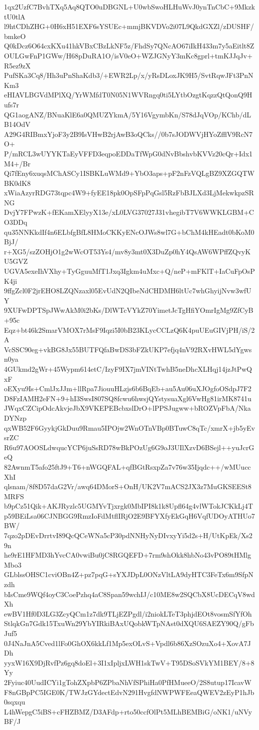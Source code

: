 1qx2UzfC7BvhTXq5Aq8QTO0uDBGNL+U0wbSwoHLHuWvJ0ynTnCbC+9MkzktU0tlA
l9htCDhZHG+0H6xH51EXF6sYSUEc+mmjBKVDVo2i07L9QkdGXZl/zDUSHF/bmkeO
Q0kDcz6O64cxKXu41hkVBxCBzLkNF5z/FhdSy7QNcAO67iIkH433m7y5aEitlt8Z
OULGwFnP1GWw/H68pDuRA1O/isV0eO+WZJGNyY3mKc8gprl+tmKJJqJv+R5ez9zX
PufSKa3Cq8/Hh3uPnShaKdb3/+EWR2Lp/x/yRsDLoxJK9H5/SvtRqwJFt3PnNKm3
eHIAVLBGVdMPlXQ/YrWMfdT0N05N1WVRngq0ti5LYtbOzgtKqzzQtQonQ9Hufs7r
QG1aogANZ/BNuaKlE6a0QMUZYkmA/5Y16VgymbKn/S78dJqVOp/KChb/dLB14OdV
A29G4RIBmxYjoF3y2B9IsVHwB2rjAwB3oQCks//0b7sJODWVjHYoZfflV9RcN7O+
P/mRCL3wUYYKTaEyVFFD3eqpoEDDaTfWpG0dNvBbshvbKVVz20cQr+Idx1M4+/Br
Qi7fEny6xuqsMChASCy1ISBKLuWMd9+YbO3aps+pF2nFzVQLgBZ9XZGQTWBK0dK8
xWiaAzyrRDG73tqpc4W9+fyEE18pk0OpSFpPqGsl5RzFbBJLXd3LjMekwkpzSRNG
DvjY7FPwzK+fEKamXElyyX13e/xL0LVG37027J31vhegibT7V6WWKLGBM+CO3DDq
qu35NNKkdIf4n6ELbfgBfL8HMoCKKyENcOJWs8wl7G+bChM4kHEadt0bKoM0BjJ/
r+XG5/szZOHjO1g2wWcOT53Ys4/mv8y3mt0X3DuZp0hY4QsAW6WPffZQvyKU5GVZ
UGVA5exeIhVXhy+TyGguuMfT1Jxq3Igkm4uMxc+Q/neP+mFKlT+IaCuFpOsPK4ji
9ffgZcl0F2jrEHO8LZQNzaxl05EvUdN2QIbeNdCHDMH6ltUc7whGhyijNvw3wfUY
9XUFwDPTSpJWwAkM0i2bKs/DlWTcVYkZ70YimetJcTgHfiYOmrIgMg9ZfCyB+95c
Eqz+bt46k2SmarVMOX7rMsF9Iqzi5I0bB23KLycCCLzQ6K4puUEuGIVjPH/iS/2A
VcSSC90eg+vkBG8Jx55BUTFQfaBwDS3bFZkUKP7efjq4nV92RXvHWL5dYgwsn0ya
4GUkmd2gWr+45Wypm614etC/IzyF9IX7jmVINtTwhB5neDhcXLHqj14jzJtPwQxF
oEXyu9Is+CmlJxJJm+llRpa7JiouuHLzjs6b6BqEb+au5Au06uXJOgfoOSdpJ7F2
D8FzIAMH2eFN+9+hI3SwsI807SQ8fcwu6hwsjQYstysuaXgl6VwHg81irMK8741u
JWqxCZCipOdcAkvjeJbX9VKEPEBcbxslDrO+lPPSJugww+bROZVpFbA/NkaDYNzp
qxWB52F6GyykjGkDuu9Rmau5IPOjw2WnOTnVBp0BTuwC8qTc/xmrX+jb5yEvsrZC
R6u97AOOSLdwqucYCP6juSsRD78wBkPOzUg6G9oJ3UIlXzvD6BSejl++yuJcrGeQ
82AwnmT5afo25ftJ9+T6+nWGQFAL+qfBGtRsxpZa7v76w35Ijqdc++/wMUuccXhI
qlsnam/8f8D57daG2Vr/awq64DMorS+OnH/UK2V7mACS2JX3z7MuGKSEESt8MRFS
b9pCz51Qik+AKJRyzlc5UGMYvTjxrgk0MbIPI8k1k8Upfl64g4vlWTokJCKkLj4T
p59BEiLsa06CJNBGG9RmzIoFdMtflIRjO2E9BFYXfyEkGqH6VqfUDOyATHUo7BW/
7qzo2pDEvDrrtvI89QcQCeWNa5cP30pdNNHyNyDIvxyYi5d2s+H/UtKpEk/Xs29n
he9rE1HFMD3hYvcCA0vwiBu0jC8RGQEFD+7rm9shOkk8hbNo43vPO89tHMlgMbo3
GLblssOHSC1cviOBn4Z+pz7pqG+sYXJDpL0ONzVltLA9dyHTC3FeTx6m9SfpNzdh
bIsCme9WQf4oyC3CoePzhq4aC8Span59wchIJ/c10ME8w2SQCbX8UcDECqV8wdXh
ewBV1Hf0D3LG3ZcyQCm1z7dk9TLjEZPgdl/i2niokLTeT3phjdEOt8vosmSfYfOh
StlqkGn7Gdk15TxuWn29YbYIRkiBAxUQobkWTpNAst0dXQU6SAEZY90Q/gFbJuf5
0J4NaJnA5Cved1lFo0GhOX6kkLf1Mp5exOLvS+Vpdl6b86XzSOzuXo4+XovA7JDh
yyxW16X9DjRvfPz6gq8doEl+3I1xIpljxLWH1skTwV+T95DSoSVkYM1BEY/8+8Yy
2Fyiuc40UudICYi1gTohZXpbP6ZPbaNhVfSPhiHa0PfHMueeO/2S8utup17IcavW
F8nGBpPC5IGE0K/TWJzGYdectEdvN291HvgfdNWPWFEeaQWEV2zEyP1hJb0sqxqu
L4hWepgC5iBS+cFHZBMZ/D3AFdp+rto50ccfOlPt5MLhBEMBiG/oNK1/uNVyBF/J
